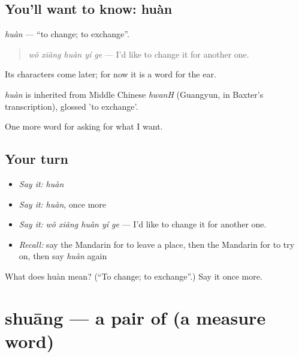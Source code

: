 \subsection*{You'll want to know: huàn}
\emph{huàn} — \textquotedblleft{}to change; to exchange\textquotedblright{}.

\begin{quote}
\emph{wǒ xiǎng huàn yí ge} — I'd like to change it for another one.
\end{quote}

Its characters come later; for now it is a word for the ear.

\begin{cousinweb}
\emph{huàn} is inherited from Middle Chinese \emph{hwanH} (Guangyun, in Baxter's transcription), glossed 'to exchange'.
\end{cousinweb}

\begin{grammarlens}[title={What you've built}]
One more word for asking for what I want.
\end{grammarlens}

\subsection*{Your turn}
\begin{itemize}
\raggedright
  \item \emph{Say it:} \emph{huàn}
  \item \emph{Say it:} \emph{huàn}, once more
  \item \emph{Say it:} \emph{wǒ xiǎng huàn yí ge} — I'd like to change it for another one.
  \item \emph{Recall:} say the Mandarin for to leave a place, then the Mandarin for to try on, then say \emph{huàn} again
\end{itemize}

\begin{tcolorbox}[breakable,colback=teal!4,colframe=teal!35!black,title={Before you move on}]
What does huàn mean? (\textquotedblleft{}To change; to exchange\textquotedblright{}.) Say it once more.
\end{tcolorbox}
\section[shuāng]{shuāng — a pair of (a measure word)}

\label{lesson:ZH-C108-shuang}



